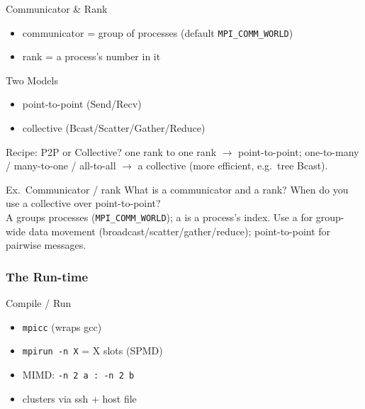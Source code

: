 
\begin{definition}{Communicator \& Rank}
    \begin{itemize}
        \item communicator = group of processes (default \texttt{MPI\_COMM\_WORLD})
        \item rank = a process's number in it
    \end{itemize}
\end{definition}

\begin{definition}{Two Models}
    \begin{itemize}
        \item point-to-point (Send/Recv)
        \item collective (Bcast/Scatter/Gather/Reduce)
    \end{itemize}
\end{definition}

\multend

\begin{KR}{Recipe: P2P or Collective?}
    one rank to one rank $\to$ point-to-point; one-to-many / many-to-one / all-to-all $\to$ a collective (more efficient, e.g.\ tree Bcast).
\end{KR}

\begin{example2}{Ex.\ Communicator / rank}
    What is a communicator and a rank? When do you use a collective over point-to-point?
     \\ 
    A  groups processes (\texttt{MPI\_COMM\_WORLD}); a  is a process's index. Use a  for group-wide data movement (broadcast/scatter/gather/reduce); point-to-point for pairwise messages.
\end{example2}

\subsubsection{The Run-time}


\begin{definition}{Compile / Run}
    \begin{itemize}
        \item \texttt{mpicc} (wraps gcc)
        \item \texttt{mpirun -n X} = X slots (SPMD)
        \item MIMD: \texttt{-n 2 a : -n 2 b}
        \item clusters via ssh + host file
    \end{itemize}
\end{definition}

